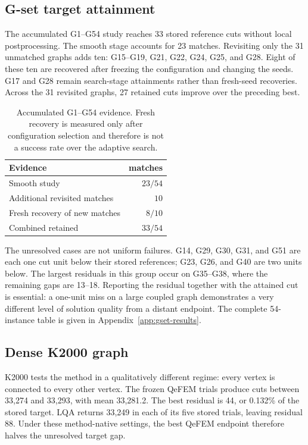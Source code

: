 \documentclass[
  aps,
  prx,
  reprint,
  amsmath,
  amssymb,
  groupedaddress,
  nofootinbib,
  floatfix,
  longbibliography
]{revtex4-2}
\newcommand{\qefem}{QeFEM}
\newcommand{\lqa}{\textsc{LQA}}
\begin{document}
\subsection{G-set target attainment}

The accumulated G1--G54 study reaches 33 stored reference cuts without local
postprocessing.  The smooth stage accounts for 23 matches.  Revisiting only
the 31 unmatched graphs adds ten: G15--G19, G21, G22, G24, G25, and G28.
Eight of these ten are recovered after freezing the configuration and changing
the seeds.  G17 and G28 remain search-stage attainments rather than fresh-seed
recoveries.  Across the 31 revisited graphs, 27 retained cuts improve over the
preceding best.

\begin{table}[t]
\caption{Accumulated G1--G54 evidence.  Fresh recovery is measured only after
configuration selection and therefore is not a success rate over the adaptive
search.}
\label{tab:gset-summary}
\centering
\small
\setlength{\tabcolsep}{5pt}
\begin{tabular}{lr}
\toprule
Evidence & matches \\
\midrule
Smooth study & $23/54$ \\
Additional revisited matches & $10$ \\
Fresh recovery of new matches & $8/10$ \\
Combined retained & $33/54$ \\
\bottomrule
\end{tabular}
\end{table}

The unresolved cases are not uniform failures.  G14, G29, G30, G31, and G51
are each one cut unit below their stored references; G23, G26, and G40 are two
units below.  The largest residuals in this group occur on G35--G38, where the
remaining gaps are 13--18.  Reporting the residual together with the attained
cut is essential: a one-unit miss on a large coupled graph demonstrates a very
different level of solution quality from a distant endpoint.  The complete
54-instance table is given in Appendix~\ref{app:gset-results}.

\subsection{Dense K2000 graph}

K2000 tests the method in a qualitatively different regime: every vertex is
connected to every other vertex.  The frozen \qefem{} trials produce cuts
between 33,274 and 33,293, with mean 33,281.2.  The best residual is 44, or
0.132\% of the stored target.  \lqa{} returns 33,249 in each of its five
stored trials, leaving residual 88.  Under these method-native settings, the
best \qefem{} endpoint therefore halves the unresolved target gap.
\end{document}
